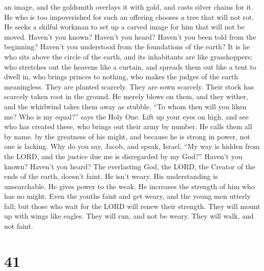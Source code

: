 an image, and the goldsmith overlays it with gold, and casts silver
chains for it.  He who is too impoverished for such an
offering chooses a tree that will not rot. He seeks a skilful workman to
set up a carved image for him that will not be moved. 
Haven't you known? Haven't you heard? Haven't you been told from the
beginning? Haven't you understood from the foundations of the earth?
 It is he who sits above the circle of the earth, and its
inhabitants are like grasshoppers; who stretches out the heavens like a
curtain, and spreads them out like a tent to dwell in,  who
brings princes to nothing, who makes the judges of the earth
meaningless.  They are planted scarcely. They are sown
scarcely. Their stock has scarcely taken root in the ground. He merely
blows on them, and they wither, and the whirlwind takes them away as
stubble.  ``To whom then will you liken me? Who is my
equal?'' says the Holy One.  Lift up your eyes on high, and
see who has created these, who brings out their army by number. He calls
them all by name. by the greatness of his might, and because he is
strong in power, not one is lacking.  Why do you say,
Jacob, and speak, Israel, ``My way is hidden from the LORD, and the
justice due me is disregarded by my God?''  Haven't you
known? Haven't you heard? The everlasting God, the LORD, the Creator of
the ends of the earth, doesn't faint. He isn't weary. His understanding
is unsearchable.  He gives power to the weak. He increases
the strength of him who has no might.  Even the youths
faint and get weary, and the young men utterly fall;  but
those who wait for the LORD will renew their strength. They will mount
up with wings like eagles. They will run, and not be weary. They will
walk, and not faint.

\hypertarget{section-40}{%
\section{41}\label{section-40}}

